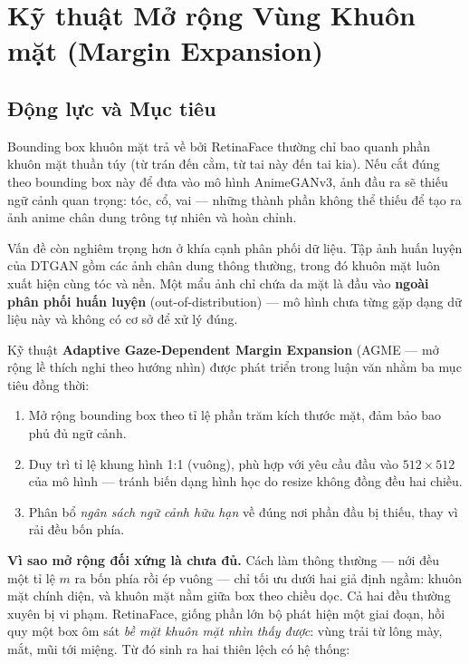 \section{Kỹ thuật Mở rộng Vùng Khuôn mặt (Margin Expansion)}
\label{sec:margin_expansion}

\subsection{Động lực và Mục tiêu}
\label{subsec:margin_motivation}

Bounding box khuôn mặt trả về bởi RetinaFace thường chỉ bao quanh phần khuôn mặt thuần túy (từ trán đến cằm, từ tai này đến tai kia). Nếu cắt đúng theo bounding box này để đưa vào mô hình AnimeGANv3, ảnh đầu ra sẽ thiếu ngữ cảnh quan trọng: tóc, cổ, vai --- những thành phần không thể thiếu để tạo ra ảnh anime chân dung trông tự nhiên và hoàn chỉnh.

Vấn đề còn nghiêm trọng hơn ở khía cạnh phân phối dữ liệu. Tập ảnh huấn luyện của DTGAN gồm các ảnh chân dung thông thường, trong đó khuôn mặt luôn xuất hiện cùng tóc và nền. Một mẩu ảnh chỉ chứa da mặt là đầu vào \textbf{ngoài phân phối huấn luyện} (out-of-distribution) --- mô hình chưa từng gặp dạng dữ liệu này và không có cơ sở để xử lý đúng.

Kỹ thuật \textbf{Adaptive Gaze-Dependent Margin Expansion} (AGME --- mở rộng lề thích nghi theo hướng nhìn) được phát triển trong luận văn nhằm ba mục tiêu đồng thời:
\begin{enumerate}
    \item Mở rộng bounding box theo tỉ lệ phần trăm kích thước mặt, đảm bảo bao phủ đủ ngữ cảnh.
    \item Duy trì tỉ lệ khung hình 1:1 (vuông), phù hợp với yêu cầu đầu vào $512 \times 512$ của mô hình --- tránh biến dạng hình học do resize không đồng đều hai chiều.
    \item Phân bổ \textit{ngân sách ngữ cảnh hữu hạn} về đúng nơi phần đầu bị thiếu, thay vì rải đều bốn phía.
\end{enumerate}

\textbf{Vì sao mở rộng đối xứng là chưa đủ.} Cách làm thông thường --- nới đều một tỉ lệ $m$ ra bốn phía rồi ép vuông --- chỉ tối ưu dưới hai giả định ngầm: khuôn mặt chính diện, và khuôn mặt nằm giữa box theo chiều dọc. Cả hai đều thường xuyên bị vi phạm. RetinaFace, giống phần lớn bộ phát hiện một giai đoạn, hồi quy một box ôm sát \textit{bề mặt khuôn mặt nhìn thấy được}: vùng trải từ lông mày, mắt, mũi tới miệng. Từ đó sinh ra hai thiên lệch có hệ thống:

